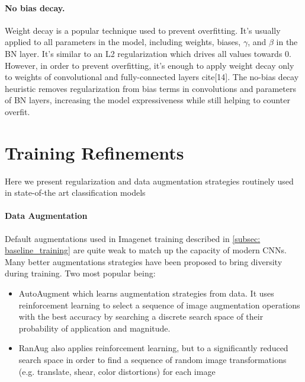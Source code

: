 \paragraph{No bias decay.}
Weight decay is a popular technique used to prevent overfitting. It's usually applied to all parameters in the model, including weights, biases, $\gamma$, and $\beta$ in the BN layer. It's similar to an L2 regularization which drives all values towards $0$. However, in order to prevent overfitting, it's enough to apply weight decay only to weights of convolutional and fully-connected layers cite[14]. The no-bias decay heuristic removes regularization from bias terms in convolutions and parameters of BN layers, increasing the model expressiveness while still helping to counter overfit.  


\section{Training Refinements}

Here we present regularization and data augmentation strategies routinely used in state-of-the art classification models \cite{lin2020neural_genet} \cite{tan2019_efficientnet} \cite{tan2021_efficientnetv2}

\paragraph{Data Augmentation}
Default augmentations used in Imagenet training described in \autoref{subsec: baseline_training} are quite weak to match up the capacity of modern CNNs. Many better augmentations strategies have been proposed to bring diversity during training. Two most popular being: 

\begin{itemize}
    \item AutoAugment \cite{cubuk2018_autoaugment} which learns augmentation strategies from data. It uses reinforcement learning to select a sequence of image augmentation operations with the best accuracy by searching a discrete search space of their probability of application and magnitude.
    \item RanAug \cite{cubuk2020_randaugment} also applies reinforcement learning, but to a significantly reduced search space in order to find a sequence of random image transformations (e.g. translate, shear, color distortions) for each image
\end{itemize}

